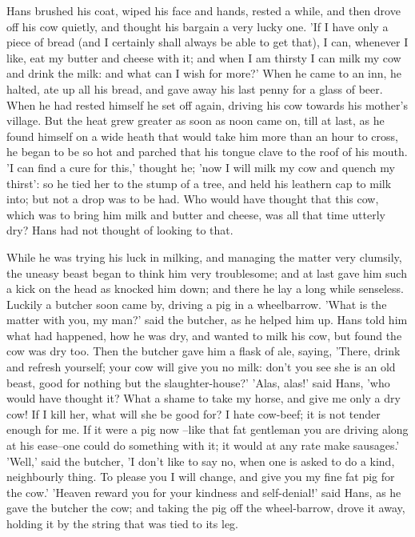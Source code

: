 \documentclass[12pt]{book}
\begin{document}
Hans brushed his coat, wiped his face and hands, rested a while, and
then drove off his cow quietly, and thought his bargain a very lucky
one. 'If I have only a piece of bread (and I certainly shall always be
able to get that), I can, whenever I like, eat my butter and cheese
with it; and when I am thirsty I can milk my cow and drink the milk:
and what can I wish for more?' When he came to an inn, he halted, ate
up all his bread, and gave away his last penny for a glass of beer.
When he had rested himself he set off again, driving his cow towards
his mother's village. But the heat grew greater as soon as noon came
on, till at last, as he found himself on a wide heath that would take
him more than an hour to cross, he began to be so hot and parched that
his tongue clave to the roof of his mouth. 'I can find a cure for
this,' thought he; 'now I will milk my cow and quench my thirst': so
he tied her to the stump of a tree, and held his leathern cap to milk
into; but not a drop was to be had. Who would have thought that this
cow, which was to bring him milk and butter and cheese, was all that
time utterly dry? Hans had not thought of looking to that.

While he was trying his luck in milking, and managing the matter very
clumsily, the uneasy beast began to think him very troublesome; and at
last gave him such a kick on the head as knocked him down; and there
he lay a long while senseless. Luckily a butcher soon came by, driving
a pig in a wheelbarrow. 'What is the matter with you, my man?' said
the butcher, as he helped him up. Hans told him what had happened, how
he was dry, and wanted to milk his cow, but found the cow was dry too.
Then the butcher gave him a flask of ale, saying, 'There, drink and
refresh yourself; your cow will give you no milk: don't you see she is
an old beast, good for nothing but the slaughter-house?' 'Alas, alas!'
said Hans, 'who would have thought it? What a shame to take my horse,
and give me only a dry cow! If I kill her, what will she be good for?
I hate cow-beef; it is not tender enough for me. If it were a pig now
--like that fat gentleman you are driving along at his ease--one could
do something with it; it would at any rate make sausages.' 'Well,'
said the butcher, 'I don't like to say no, when one is asked to do a
kind, neighbourly thing. To please you I will change, and give you my
fine fat pig for the cow.' 'Heaven reward you for your kindness and
self-denial!' said Hans, as he gave the butcher the cow; and taking
the pig off the wheel-barrow, drove it away, holding it by the string
that was tied to its leg.
\end{document}

